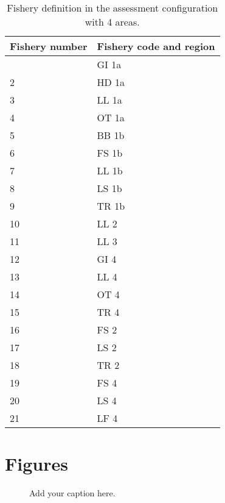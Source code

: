 \documentclass[
]{scrartcl}
\begin{document}
\newpage{}

\begin{longtable}[]{@{}ll@{}}

\caption{\label{tbl-fleet-4A}Fishery definition in the assessment
configuration with 4 areas.}

\tabularnewline

\toprule\noalign{}
Fishery number & Fishery code and region \\
\midrule\noalign{}
\endhead
\bottomrule\noalign{}
\endlastfoot
1 & GI 1a \\
2 & HD 1a \\
3 & LL 1a \\
4 & OT 1a \\
5 & BB 1b \\
6 & FS 1b \\
7 & LL 1b \\
8 & LS 1b \\
9 & TR 1b \\
10 & LL 2 \\
11 & LL 3 \\
12 & GI 4 \\
13 & LL 4 \\
14 & OT 4 \\
15 & TR 4 \\
16 & FS 2 \\
17 & LS 2 \\
18 & TR 2 \\
19 & FS 4 \\
20 & LS 4 \\
21 & LF 4 \\

\end{longtable}

\newpage{}

\section{Figures}\label{figures}

\begin{figure}


\caption{\label{fig-4A-config}Add your caption here.}

\end{figure}%
\end{document}
